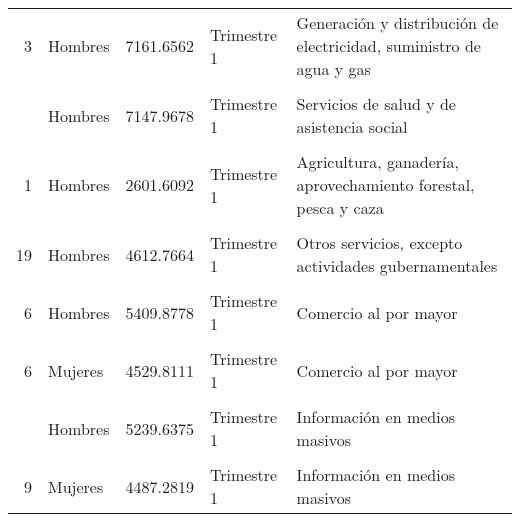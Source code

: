 \documentclass{article}
\begin{document}
\begin{table}[!h]
\begin{tabular}{rlrll}
3 & Hombres & 7161.6562 & Trimestre 1 & Generación y distribución de electricidad, suministro de agua y gas\\
\cellcolor{gray!10}{8} & \cellcolor{gray!10}{Hombres} & \cellcolor{gray!10}{5852.1951} & \cellcolor{gray!10}{Trimestre 1} & \cellcolor{gray!10}{Transportes, correos y almacenamiento}\\
\addlinespace
16 & Hombres & 7147.9678 & Trimestre 1 & Servicios de salud y de asistencia social\\
\cellcolor{gray!10}{15} & \cellcolor{gray!10}{Hombres} & \cellcolor{gray!10}{6517.9236} & \cellcolor{gray!10}{Trimestre 1} & \cellcolor{gray!10}{Servicios educativos}\\
1 & Hombres & 2601.6092 & Trimestre 1 & Agricultura, ganadería, aprovechamiento forestal, pesca y caza\\
\cellcolor{gray!10}{12} & \cellcolor{gray!10}{Hombres} & \cellcolor{gray!10}{5942.6854} & \cellcolor{gray!10}{Trimestre 1} & \cellcolor{gray!10}{Servicios profesionales, científicos y técnicos}\\
19 & Hombres & 4612.7664 & Trimestre 1 & Otros servicios, excepto actividades gubernamentales\\
\addlinespace
\cellcolor{gray!10}{16} & \cellcolor{gray!10}{Mujeres} & \cellcolor{gray!10}{5418.8318} & \cellcolor{gray!10}{Trimestre 1} & \cellcolor{gray!10}{Servicios de salud y de asistencia social}\\
6 & Hombres & 5409.8778 & Trimestre 1 & Comercio al por mayor\\
\cellcolor{gray!10}{21} & \cellcolor{gray!10}{Mujeres} & \cellcolor{gray!10}{1108.1181} & \cellcolor{gray!10}{Trimestre 1} & \cellcolor{gray!10}{No especificado}\\
6 & Mujeres & 4529.8111 & Trimestre 1 & Comercio al por mayor\\
\cellcolor{gray!10}{18} & \cellcolor{gray!10}{Hombres} & \cellcolor{gray!10}{4482.3793} & \cellcolor{gray!10}{Trimestre 1} & \cellcolor{gray!10}{Servicios de hospedaje y de preparación de alimentos y bebidas}\\
\addlinespace
9 & Hombres & 5239.6375 & Trimestre 1 & Información en medios masivos\\
\cellcolor{gray!10}{17} & \cellcolor{gray!10}{Hombres} & \cellcolor{gray!10}{5069.9609} & \cellcolor{gray!10}{Trimestre 1} & \cellcolor{gray!10}{Servicios de esparcimiento, culturales y deportivos}\\
9 & Mujeres & 4487.2819 & Trimestre 1 & Información en medios masivos\\

\end{tabular}
\end{table}
\end{document}
